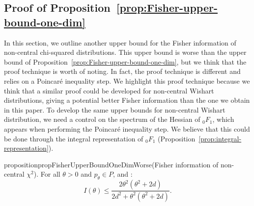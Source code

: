 \documentclass{article}
\theoremstyle{plain}
\theoremstyle{definition}
\theoremstyle{remark}
\begin{document}
\subsection{Proof of Proposition~\ref{prop:Fisher-upper-bound-one-dim}}
\label{app:improvement-fisher-multiple}
In this section, we outline another upper bound for the Fisher information of non-central chi-squared distributions. This upper bound is worse than the upper bound of Proposition~\ref{prop:Fisher-upper-bound-one-dim}, but we think that the proof technique is worth of noting. In fact, the proof technique is different and relies on a Poincaré inequality step. We highlight this proof technique because we think that a similar proof could be developed for non-central Wishart distributions, giving a potential better Fisher information than the one we obtain in this paper. To develop the same upper bounds for non-central Wishart distribution, we need a control on the spectrum of the Hessian of ${}_0F_1$, which appears when performing the Poincaré inequality step. We believe that this could be done through the integral representation of ${}_0F_1$ (Proposition~\ref{prop:integral-representation}).
\begin{restatable}{proposition}{propFisherUpperBoundOneDimWorse}\normalfont(Fisher information of non-central $\chi^2$).
\label{prop:Fisher-upper-bound-one-dim-worse}
For all $\theta> 0$ and  $p_\theta \in P$, and :
    \[I(\theta) \leq \frac{2\theta^2(\theta^2 + 2d)}{2d^2 +  \theta^2(\theta^2 + 2d)}.\]
\end{restatable}
\end{document}

